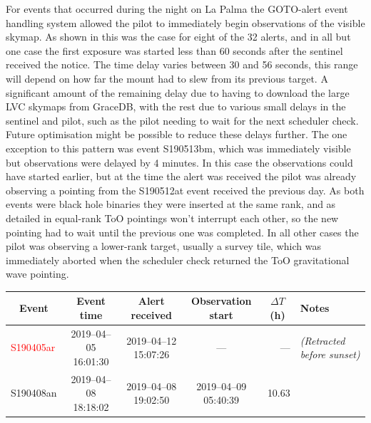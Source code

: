 \begin{colsection}
\begin{colsection}
For events that occurred during the night on La Palma the GOTO-alert event handling system allowed the pilot to immediately begin observations of the visible skymap. As shown in  this was the case for eight of the 32 alerts, and in all but one case the first exposure was started less than 60 seconds after the sentinel received the notice. The time delay varies between 30 and 56 seconds, this range will depend on how far the mount had to slew from its previous target. A significant amount of the remaining delay due to having to download the large LVC skymaps from GraceDB, with the rest due to various small delays in the sentinel and pilot, such as the pilot needing to wait for the next scheduler check. Future optimisation might be possible to reduce these delays further. The one exception to this pattern was event S190513bm, which was immediately visible but observations were delayed by 4 minutes. In this case the observations could have started earlier, but at the time the alert was received the pilot was already observing a pointing from the S190512at event received the previous day. As both events were black hole binaries they were inserted at the same rank, and as detailed in
equal-rank ToO pointings won't interrupt each other, so the new pointing had to wait until the previous one was completed. In all other cases the pilot was observing a lower-rank target, usually a survey tile, which was immediately aborted when the scheduler check returned the ToO gravitational wave pointing.

\begin{table}
    \begin{footnotesize}
    \begin{center}
        \begin{tabular}{l|cccrl} %

            \multicolumn{1}{c|}{Event} &
            Event time &
            Alert received &
            Observation start &
            \multicolumn{1}{c}{$\Delta T$ (h)} &
            Notes
            \\
            \midrule
            \textcolor{Red}{S190405ar} &
            2019--04--05 16:01:30 &
            2019--04--12 15:07:26 &
            --- &
            --- &
            \textit{(Retracted before sunset)}
            \\
            S190408an &
            2019--04--08 18:18:02 &
            2019--04--08 19:02:50 &
            2019--04--09 05:40:39 &
            10.63 &


\end{tabular}
\end{center}
\end{footnotesize}
\end{table}
\end{colsection}
\end{colsection}
